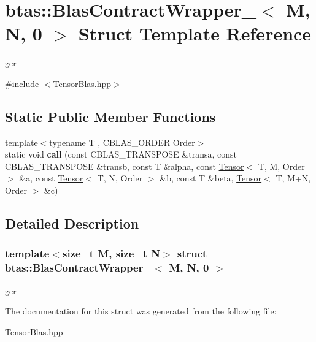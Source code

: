 \hypertarget{structbtas_1_1_blas_contract_wrapper___3_01_m_00_01_n_00_010_01_4}{
\section{btas::BlasContractWrapper\_\-$<$ M, N, 0 $>$ Struct Template Reference}
\label{structbtas_1_1_blas_contract_wrapper___3_01_m_00_01_n_00_010_01_4}
}


ger  


{\ttfamily \#include $<$TensorBlas.hpp$>$}\subsection*{Static Public Member Functions}
\begin{DoxyCompactItemize}
\item 
\hypertarget{structbtas_1_1_blas_contract_wrapper___3_01_m_00_01_n_00_010_01_4_ae5f779bb8480bb825d121584f1ecfc02}{
{\footnotesize template$<$typename T , CBLAS\_\-ORDER Order$>$ }\\static void {\bfseries call} (const CBLAS\_\-TRANSPOSE \&transa, const CBLAS\_\-TRANSPOSE \&transb, const T \&alpha, const \hyperlink{classbtas_1_1_tensor}{Tensor}$<$ T, M, Order $>$ \&a, const \hyperlink{classbtas_1_1_tensor}{Tensor}$<$ T, N, Order $>$ \&b, const T \&beta, \hyperlink{classbtas_1_1_tensor}{Tensor}$<$ T, M+N, Order $>$ \&c)}
\label{structbtas_1_1_blas_contract_wrapper___3_01_m_00_01_n_00_010_01_4_ae5f779bb8480bb825d121584f1ecfc02}

\end{DoxyCompactItemize}


\subsection{Detailed Description}
\subsubsection*{template$<$size\_\-t M, size\_\-t N$>$ struct btas::BlasContractWrapper\_\-$<$ M, N, 0 $>$}

ger 

The documentation for this struct was generated from the following file:\begin{DoxyCompactItemize}
\item 
TensorBlas.hpp\end{DoxyCompactItemize}
